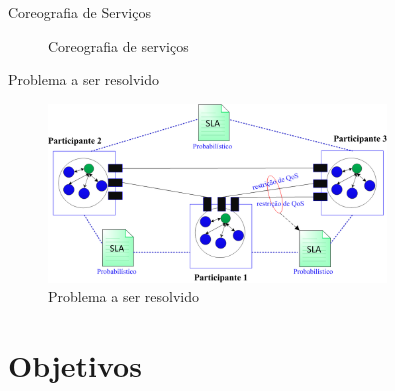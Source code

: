 \documentclass[xcolor=svgnames]{beamer}
\begin{document}
\begin{frame}{Coreografia de Serviços}
{\begin{figure}[!h]
                  \caption{Coreografia de serviços}
              \end{figure}	
          }
    \end{frame}


    \begin{frame}{Problema a ser resolvido}
      \begin{figure}[!h]
	  \centering
	  \includegraphics[width=0.8\textwidth]{ChoreographySLAs.png}
	  \caption{Problema a ser resolvido}
      \end{figure}	
    \end{frame}




\section{Objetivos}
\end{document}
